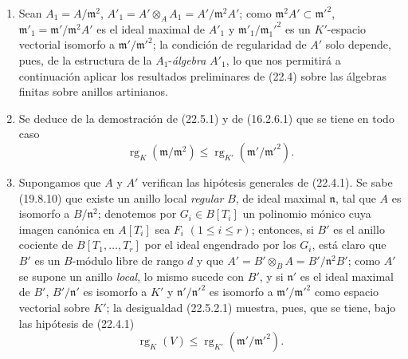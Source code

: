 \begin{remark}[22.5.2]
\label{0.22.5.2-fr}
\begin{enumerate}
  \item[\rm(i)] Sean $A_1=A/\mathfrak m^2$,
  $A'_1=A'\otimes_AA_1=A'/\mathfrak m^2A'$; como
  $\mathfrak m^2A'\subset\mathfrak m'^2$,
  $\mathfrak m'_1=\mathfrak m'/\mathfrak m^2A'$ es el ideal maximal de $A'_1$
  y $\mathfrak m'_1/\mathfrak m_1'^2$ es un $K'$-espacio vectorial isomorfo
  a $\mathfrak m'/\mathfrak m'^2$; la condición de regularidad de $A'$ solo
  depende, pues, de la estructura de la $A_1$-\emph{álgebra} $A'_1$, lo que nos
  permitirá a continuación aplicar los resultados preliminares de (22.4) sobre
  las álgebras finitas sobre anillos artinianos.
  \item[\rm(ii)] Se deduce de la demostración de (22.5.1) y de (16.2.6.1)
  que se tiene en todo caso
  \begin{equation}
  \label{0.22.5.2.1-fr}
    \operatorname{rg}_K(\mathfrak m/\mathfrak m^2)
    \leqslant\operatorname{rg}_{K'}(\mathfrak m'/\mathfrak m'^2).
    \tag{22.5.2.1}
  \end{equation}


  \item[\rm(iii)] Supongamos que $A$ y $A'$ verifican las hipótesis generales
  de (22.4.1). Se sabe (19.8.10) que existe un anillo local \emph{regular}
  $B$, de ideal maximal $\mathfrak n$, tal que $A$ es isomorfo a
  $B/\mathfrak n^2$; denotemos por $G_i\in B[T_i]$ un polinomio mónico cuya
  imagen canónica en $A[T_i]$ sea $F_i$ $(1\leqslant i\leqslant r)$;
  entonces, si $B'$ es el anillo cociente de $B[T_1,\ldots,T_r]$ por el ideal
  engendrado por los $G_i$, está claro que $B'$ es un $B$-módulo libre de rango
  $d$ y que $A'=B'\otimes_BA=B'/\mathfrak n^2B'$; como $A'$ se supone un
  anillo \emph{local}, lo mismo sucede con $B'$, y si $\mathfrak n'$ es el ideal
  maximal de $B'$, $B'/\mathfrak n'$ es isomorfo a $K'$ y
  $\mathfrak n'/\mathfrak n'^2$ es isomorfo a $\mathfrak m'/\mathfrak m'^2$ como
  espacio vectorial sobre $K'$; la desigualdad (22.5.2.1) muestra, pues, que
  se tiene, bajo las hipótesis de (22.4.1)
  \begin{equation}
  \label{0.22.5.2.2-fr}
    \operatorname{rg}_K(V)\leqslant\operatorname{rg}_{K'}(\mathfrak m'/\mathfrak m'^2).
    \tag{22.5.2.2}
  \end{equation}
\end{enumerate}
\end{remark}

